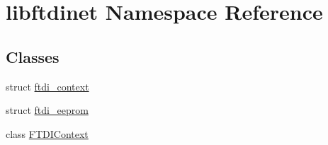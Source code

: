 \hypertarget{namespacelibftdinet}{}\section{libftdinet Namespace Reference}
\label{namespacelibftdinet}
\subsection*{Classes}
\begin{DoxyCompactItemize}
\item 
struct \mbox{\hyperlink{structlibftdinet_1_1ftdi__context}{ftdi\+\_\+context}}
\item 
struct \mbox{\hyperlink{structlibftdinet_1_1ftdi__eeprom}{ftdi\+\_\+eeprom}}
\item 
class \mbox{\hyperlink{classlibftdinet_1_1_f_t_d_i_context}{F\+T\+D\+I\+Context}}
\end{DoxyCompactItemize}
